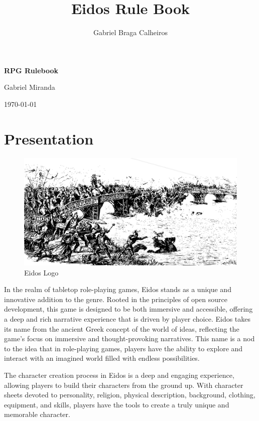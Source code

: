 \documentclass[twocolumn,12pt]{article}  %
\title{Eidos Rule Book}
\author{Gabriel Braga Calheiros}
\newcommand{\coverpage}{
    \begin{titlepage}
        \centering
        \vspace*{5cm}
        {\Huge\bfseries RPG Rulebook\par}
        \vspace{1cm}
        {\LARGE Gabriel Miranda\par}
        \vfill
        {\Large \today\par}
    \end{titlepage}
}
\begin{document}
\coverpage

\maketitle

\section*{Presentation}

\onecolumn
\begin{figure}[H]  %
    \centering
    \includegraphics[width=\linewidth]{./images/index01.pdf}
    \caption{Eidos Logo}
\end{figure}
\twocolumn  %

\noindent %

In the realm of tabletop role-playing games, Eidos stands as a unique and innovative addition to the genre. Rooted in the principles of open source development, this game is designed to be both immersive and accessible, offering a deep and rich narrative experience that is driven by player choice. Eidos takes its name from the ancient Greek concept of the world of ideas, reflecting the game's focus on immersive and thought-provoking narratives. This name is a nod to the idea that in role-playing games, players have the ability to explore and interact with an imagined world filled with endless possibilities.

The character creation process in Eidos is a deep and engaging experience, allowing players to build their characters from the ground up. With character sheets devoted to personality, religion, physical description, background, clothing, equipment, and skills, players have the tools to create a truly unique and memorable character.
\end{document}
